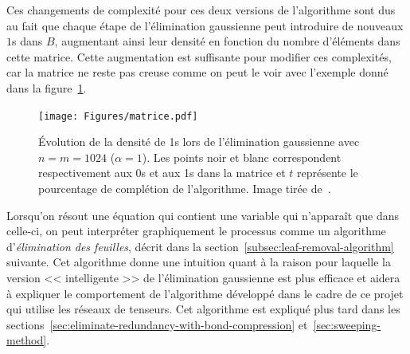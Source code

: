 Ces changements de complexité pour ces deux versions de l'algorithme sont dus au fait que chaque étape de l'élimination gaussienne peut introduire de nouveaux $1$s dans $B$, augmentant ainsi leur densité en fonction du nombre d'éléments dans cette matrice.
Cette augmentation est suffisante pour modifier ces complexités, car la matrice ne reste pas creuse comme on peut le voir avec l'exemple donné dans la figure~\ref{fig:GE-ones-density}.
\begin{figure}[h]
    \centering
    \texttt{[image: Figures/matrice.pdf]}
    \caption[Évolution de la densité de 1s lors de l'élimination gaussienne avec $n = m = 1024$ ($\alpha = 1$).]{Évolution de la densité de 1s lors de l'élimination gaussienne avec $n = m = 1024$ ($\alpha = 1$). Les points noir et blanc correspondent respectivement aux 0s et aux 1s dans la matrice et $t$ représente le pourcentage de complétion de l'algorithme. Image tirée de~\protect\cite{braunstein_complexity_2002}.}
    \label{fig:GE-ones-density}
\end{figure}


Lorsqu'on résout une équation qui contient une variable qui n'apparaît que dans celle-ci, on peut interpréter graphiquement le processus comme un algorithme d'\emph{élimination des feuilles}, décrit dans la section~\ref{subsec:leaf-removal-algorithm} suivante.
Cet algorithme donne une intuition quant à la raison pour laquelle la version << intelligente >> de l'élimination gaussienne est plus efficace et aidera à expliquer le comportement de l'algorithme développé dans le cadre de ce projet qui utilise les réseaux de tenseurs.
Cet algorithme est expliqué plus tard dans les sections~\ref{sec:eliminate-redundancy-with-bond-compression} et~\ref{sec:sweeping-method}.

